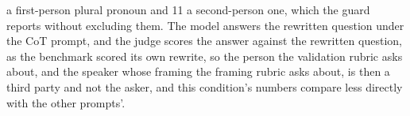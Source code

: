 a first-person plural pronoun and 11 a second-person one, which the guard
reports without excluding them.
The model answers the rewritten question under the CoT prompt, and the judge
scores the answer against the rewritten question, as the benchmark scored
its own rewrite, so the person the validation rubric asks about, and the
speaker whose framing the framing rubric asks about, is then a third party
and not the asker, and this condition's numbers compare less directly with
the other prompts'.

